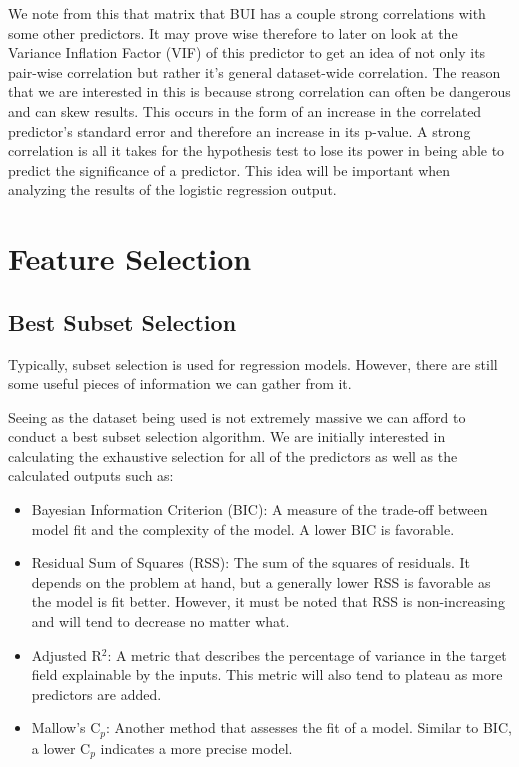 \documentclass[
]{article}
\begin{document}
We note from this that matrix that BUI has a couple strong correlations
with some other predictors. It may prove wise therefore to later on look
at the Variance Inflation Factor (VIF) of this predictor to get an idea
of not only its pair-wise correlation but rather it's general
dataset-wide correlation. The reason that we are interested in this is
because strong correlation can often be dangerous and can skew results.
This occurs in the form of an increase in the correlated predictor's
standard error and therefore an increase in its p-value. A strong
correlation is all it takes for the hypothesis test to lose its power in
being able to predict the significance of a predictor. This idea will be
important when analyzing the results of the logistic regression output.

\section{Feature Selection}\label{feature-selection}

\subsection{Best Subset Selection}\label{best-subset-selection}

Typically, subset selection is used for regression models. However,
there are still some useful pieces of information we can gather from it.

Seeing as the dataset being used is not extremely massive we can afford
to conduct a best subset selection algorithm. We are initially
interested in calculating the exhaustive selection for all of the
predictors as well as the calculated outputs such as:

\begin{itemize}
\item
  Bayesian Information Criterion (BIC): A measure of the trade-off
  between model fit and the complexity of the model. A lower BIC is
  favorable.
\item
  Residual Sum of Squares (RSS): The sum of the squares of residuals. It
  depends on the problem at hand, but a generally lower RSS is favorable
  as the model is fit better. However, it must be noted that RSS is
  non-increasing and will tend to decrease no matter what.
\item
  Adjusted R\(^2\): A metric that describes the percentage of variance
  in the target field explainable by the inputs. This metric will also
  tend to plateau as more predictors are added.
\item
  Mallow's C\(_p\): Another method that assesses the fit of a model.
  Similar to BIC, a lower C\(_p\) indicates a more precise model.
\end{itemize}
\end{document}
